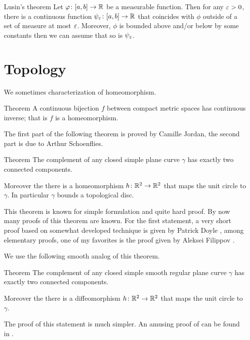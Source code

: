 \begin{thm}{Lusin's theorem}\label{thm:lusin}
Let $\varphi\colon[a,b]\to \mathbb{R}$ be a measurable function.
Then for any $\varepsilon>0$, there is a continuous function $\psi_\varepsilon\colon[a,b]\to \mathbb{R}$ that coincides with $\phi$ outside of a set of measure at most $\varepsilon$.
Moreover, $\phi$ is bounded above and/or below by some constants then we can assume that so is $\psi_\varepsilon$.  
\end{thm}

\section{Topology}

We sometimes characterization of homeomorphism.

\begin{thm}{Theorem}\label{thm:Hausdorff-compact}
A continuous bijection $f$ between compact metric spaces has continuous inverse;
that is $f$ is a homeomorphism.
\end{thm}


The first part of the following theorem is proved by Camille Jordan, the second part is due to Arthur Schoenflies.

\begin{thm}{Theorem}
The complement of any closed simple plane curve $\gamma$ has exactly two connected components. 

Moreover the there is a homeomorphism $h\colon\mathbb{R}^2\to \mathbb{R}^2$ that maps the unit circle to $\gamma$.
In particular $\gamma$ bounds a topological disc.
\end{thm}

This theorem is known for simple formulation and quite hard proof.
By now many proofs of this theorem are known.
For the first statement, a very short proof based on somewhat developed technique is given by Patrick Doyle \cite{doyle},
among elementary proofs, one of my favorites is the proof given by Aleksei Filippov \cite{filippov}.

We use the following smooth analog of this theorem.

\begin{thm}{Theorem}
The complement of any closed simple smooth regular plane curve $\gamma$ has exactly two connected components. 

Moreover the there is a diffeomorphism $h\colon\mathbb{R}^2\to \mathbb{R}^2$ that maps the unit circle to $\gamma$.
\end{thm}

The proof of this statement is much simpler.
An amusing proof of can be found in \cite{chambers-liokumovich}.


